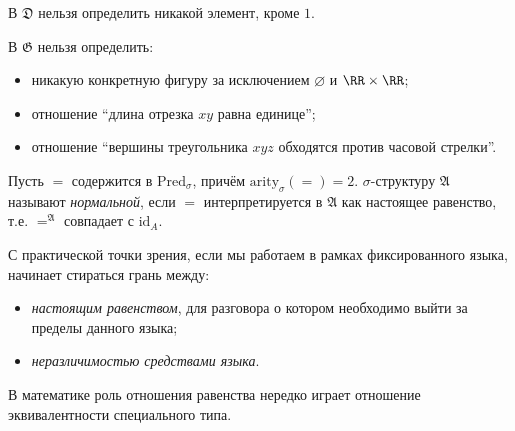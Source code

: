 \documentclass[12pt,a4paper]{article}
\newcommand{\Pred}{\ensuremath{\mathrm{Pred}}\xspace}
\newcommand{\arity}{\ensuremath{\mathrm{arity}}\xspace}
\newcommand{\id}{\ensuremath{\mathrm{id}}\xspace}
\begin{document}
    \begin{example}
        В \hyperlink{D-structure-definition}{$\mathfrak{D}$} нельзя определить никакой элемент, кроме $1$.
    \end{example}

    \begin{example}
        В \hyperlink{G-structure-definition}{$\mathfrak{G}$} нельзя определить:
        \begin{itemize}
            \item никакую конкретную фигуру за исключением $\varnothing$ и $\RR \times \RR$;
            \item отношение ``длина отрезка $xy$ равна единице'';
            \item отношение ``вершины треугольника $xyz$ обходятся против часовой стрелки''.
        \end{itemize}
    \end{example}

    \begin{definition}
        Пусть $=$ содержится в $\Pred_\sigma$, причём $\arity_\sigma({=}) = 2$. $\sigma$-структуру $\mathfrak{A}$ называют \emph{нормальной}, если $=$ интерпретируется в $\mathfrak{A}$ как настоящее равенство, т.е. ${=}^\mathfrak{A}$ совпадает с $\id_A$.
    \end{definition}

    \begin{remark}
        С практической точки зрения, если мы работаем в рамках фиксированного языка, начинает стираться грань между:
        \begin{itemize}
            \item \emph{настоящим равенством}, для разговора о котором необходимо выйти за пределы данного языка;
            \item \emph{неразличимостью средствами языка}.
        \end{itemize}
        В математике роль отношения равенства нередко играет отношение эквивалентности специального типа.
    \end{remark}
\end{document}
